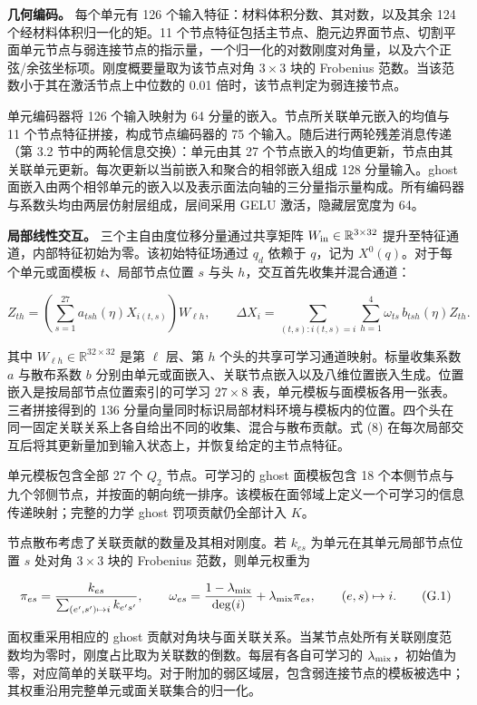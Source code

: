 \documentclass[preprint,12pt,authoryear]{elsarticle}
\begin{document}
\textbf{几何编码。} 每个单元有 126 个输入特征：材料体积分数、其对数，以及其余 124 个经材料体积归一化的矩。11 个节点特征包括主节点、胞元边界面节点、切割平面单元节点与弱连接节点的指示量，一个归一化的对数刚度对角量，以及六个正弦/余弦坐标项。刚度概要量取为该节点对角 \(3\times3\) 块的 Frobenius 范数。当该范数小于其在激活节点上中位数的 0.01 倍时，该节点判定为弱连接节点。

单元编码器将 126 个输入映射为 64 分量的嵌入。节点所关联单元嵌入的均值与 11 个节点特征拼接，构成节点编码器的 75 个输入。随后进行两轮残差消息传递（第 3.2 节中的两轮信息交换）：单元由其 27 个节点嵌入的均值更新，节点由其关联单元更新。每次更新以当前嵌入和聚合的相邻嵌入组成 128 分量输入。ghost 面嵌入由两个相邻单元的嵌入以及表示面法向轴的三分量指示量构成。所有编码器与系数头均由两层仿射层组成，层间采用 GELU 激活，隐藏层宽度为 64。

\textbf{局部线性交互。} 三个主自由度位移分量通过共享矩阵 \(W_{\rm in}\in\mathbb R^{3\times32}\) 提升至特征通道，内部特征初始为零。该初始特征场通过 \(q_d\) 依赖于 \(q\)，记为 \(X^0(q)\)。对于每个单元或面模板 \(t\)、局部节点位置 \(s\) 与头 \(h\)，交互首先收集并混合通道：

\[
Z_{th}=\left(\sum_{s=1}^{27}a_{tsh}(\eta)X_{i(t,s)}\right)W_{\ell h},
\qquad
\Delta X_i=\sum_{(t,s):i(t,s)=i}\sum_{h=1}^{4}
\omega_{ts}\,b_{tsh}(\eta)Z_{th}.
\]

其中 \(W_{\ell h}\in\mathbb R^{32\times32}\) 是第 \(\ell\) 层、第 \(h\) 个头的共享可学习通道映射。标量收集系数 \(a\) 与散布系数 \(b\) 分别由单元或面嵌入、关联节点嵌入以及八维位置嵌入生成。位置嵌入是按局部节点位置索引的可学习 \(27\times8\) 表，单元模板与面模板各用一张表。三者拼接得到的 136 分量向量同时标识局部材料环境与模板内的位置。四个头在同一固定关联关系上各自给出不同的收集、混合与散布贡献。式 (8) 在每次局部交互后将其更新量加到输入状态上，并恢复给定的主节点特征。

单元模板包含全部 27 个 \(Q_2\) 节点。可学习的 ghost 面模板包含 18 个本侧节点与九个邻侧节点，并按面的朝向统一排序。该模板在面邻域上定义一个可学习的信息传递映射；完整的力学 ghost 罚项贡献仍全部计入 \(K\)。

节点散布考虑了关联贡献的数量及其相对刚度。若 \(k_{es}\) 为单元在其单元局部节点位置 \(s\) 处对角 \(3\times3\) 块的 Frobenius 范数，则单元权重为

\[
\pi_{es}=\frac{k_{es}}{\sum_{(e',s')\mapsto i}k_{e's'}},
\qquad
\omega_{es}=\frac{1-\lambda_{\rm mix}}{\deg(i)}
 +\lambda_{\rm mix}\pi_{es},\qquad(e,s)\mapsto i.
\tag{G.1}
\]

面权重采用相应的 ghost 贡献对角块与面关联关系。当某节点处所有关联刚度范数均为零时，刚度占比取为关联数的倒数。每层有各自可学习的 \(\lambda_{\rm mix}\)，初始值为零，对应简单的关联平均。对于附加的弱区域层，包含弱连接节点的模板被选中；其权重沿用完整单元或面关联集合的归一化。
\end{document}
